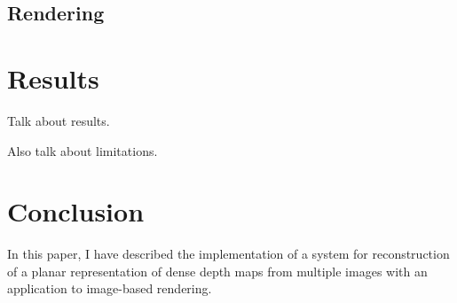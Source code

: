 \documentclass[conference]{acmsiggraph}
\begin{document}
\subsection{Rendering}



\section{Results}

Talk about results.

Also talk about limitations.

\section{Conclusion}

In this paper, I have described the implementation of a system for
reconstruction of a planar representation of dense depth maps from multiple images
with an application to image-based rendering.




\end{document}
